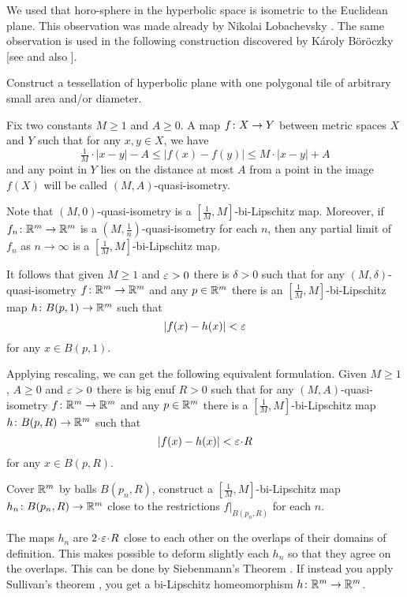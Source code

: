 We used that horo-sphere in the hyperbolic space is isometric to the Euclidean plane.
This observation was made already by Nikolai Lobachevsky \cite[see 34 in][]{lobachevsky}.
The same observation is used in the following construction discovered by 
K\'{a}roly B\"{o}r\"{o}czky [see  and also ]. 

\begin{pr}
Construct a tessellation of hyperbolic plane with one polygonal tile of arbitrary small area and/or diameter.  
\end{pr}

Fix two constants $M\ge 1$ and $A\ge 0$.
A map $f\:X\z\to Y$ between metric spaces $X$ and $Y$ such that for any $x,y\in X$,
 we have
\[\tfrac1M\cdot |x-y|-A\le |f(x)-f(y)|\le M\cdot |x-y|+A\]
and any point in $Y$ lies on the distance at most $A$ from a point in the image $f(X)$
will be called $(M,A)$-quasi-isometry.

{\sloppy
Note that $(M,0)$-quasi-isometry is a $[\tfrac1M,M]$-bi-Lipschitz map.
Moreover,
if $f_n\colon\mathbb{R}^m\to\mathbb{R}^m$ is a  $(M,\frac1n)$-quasi-isometry 
for each $n$, 
then any partial limit of $f_n$ as $n\to\infty$
is a $[\tfrac1M,M]$-bi-Lipschitz map.

}

It follows that given $M\ge 1$ and $\varepsilon>0$ there is $\delta>0$ such that 
for any $(M,\delta)$-quasi-isometry $f\colon\mathbb{R}^m\to\mathbb{R}^m$ and any $p\in \mathbb{R}^m$
there is an $[\tfrac1M,M]$-bi-Lipschitz map $h\colon B(p,1)\to \mathbb{R}^m$
such that
\[|f(x)-h(x)|<\varepsilon\]
for any $x\in B(p,1)$.

Applying rescaling, we can get the following equivalent formulation. 
Given $M\ge 1$, $A\ge 0$ and $\varepsilon>0$
there is big enuf $R>0$ such that for any $(M,A)$-quasi-isometry 
$f\colon\mathbb{R}^m\to\mathbb{R}^m$ and any $p\in\mathbb{R}^m$ there is a $[\tfrac1M,M]$-bi-Lipschitz map $h\colon B(p,R)\to \mathbb{R}^m$
such that 
\[|f(x)-h(x)|<\eps\cdot R\]
for any $x\in B(p,R)$.

Cover $\mathbb{R}^m$ by balls
$B(p_n,R)$, construct a $[\tfrac1M,M]$-bi-Lipschitz map $h_n\colon B(p_n,R)\to \mathbb{R}^m$ close to the restrictions $f|_{B(p_n,R)}$ for each $n$.

The maps $h_n$ are $2\cdot \eps\cdot R$ close to each other on the overlaps of their domains of definition.
This makes possible to deform slightly each $h_n$ so that they agree on the overlaps.
This can be done by Siebenmann's Theorem \cite[see][]{siebenmann}.
If instead you apply Sullivan's theorem \cite[see][]{sullivan}, you get a bi-Lipschitz homeomorphism $h\:\RR^m\z\to\RR^m$.\qeds


